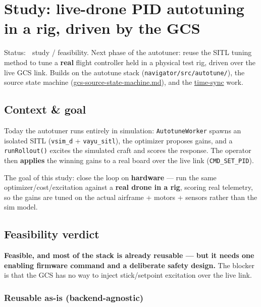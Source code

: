 \documentclass[
  11pt,
]{article}
\author{}
\date{}
\begin{document}
\hypertarget{study-live-drone-pid-autotuning-in-a-rig-driven-by-the-gcs}{%
\section{Study: live-drone PID autotuning in a rig, driven by the
GCS}\label{study-live-drone-pid-autotuning-in-a-rig-driven-by-the-gcs}}

Status: 🔬 study / feasibility. Next phase of the autotuner: reuse the
SITL tuning method to tune a \textbf{real} flight controller held in a
physical test rig, driven over the live GCS link. Builds on the autotune
stack (\texttt{navigator/src/autotune/}), the source state machine
(\url{gcs-source-state-machine.md}), and the
\href{../../../docs/telemetry/time_sync.md}{time-sync} work.

\hypertarget{context--goal}{%
\subsection{Context \& goal}\label{context--goal}}

Today the autotuner runs entirely in simulation: \texttt{AutotuneWorker}
spawns an isolated SITL (\texttt{vsim\_d} + \texttt{vayu\_sitl}), the
optimizer proposes gains, and a \texttt{runRollout()} excites the
simulated craft and scores the response. The operator then
\textbf{applies} the winning gains to a real board over the live link
(\texttt{CMD\_SET\_PID}).

The goal of this study: close the loop on \textbf{hardware} --- run the
same optimizer/cost/excitation against a \textbf{real drone in a rig},
scoring real telemetry, so the gains are tuned on the actual airframe +
motors + sensors rather than the sim model.

\hypertarget{feasibility-verdict}{%
\subsection{Feasibility verdict}\label{feasibility-verdict}}

\textbf{Feasible, and most of the stack is already reusable --- but it
needs one enabling firmware command and a deliberate safety design.} The
blocker is that the GCS has no way to inject stick/setpoint excitation
over the live link.

\hypertarget{reusable-as-is-backend-agnostic}{%
\subsubsection{Reusable as-is
(backend-agnostic)}\label{reusable-as-is-backend-agnostic}}
\end{document}
